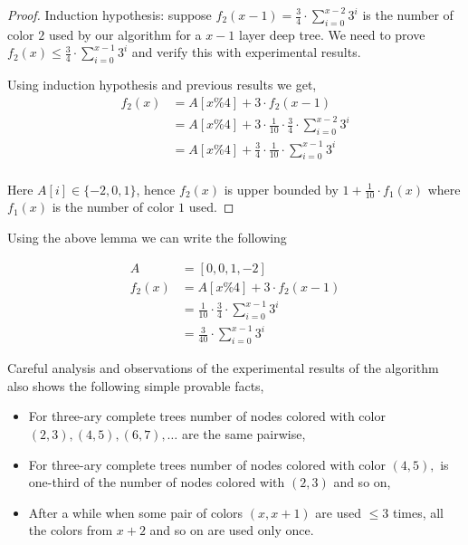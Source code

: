 \documentclass{article}
\theoremstyle{remark}
\begin{document}
\begin{proof}
    Induction hypothesis: suppose $f_2(x - 1) = \frac{3}{4} \cdot \displaystyle\sum_{i = 0} ^{x - 2} 3^i$ is the number of color $2$ used by our algorithm for a $x - 1$ layer deep tree. We need to prove $f_2(x) \leq \frac{3}{4} \cdot \displaystyle\sum_{i = 0} ^{x - 1} 3^i$ and verify this with experimental results.

    Using induction hypothesis and previous results we get,
    \begin{align*}
        f_2(x) &= A[x\%4] + 3 \cdot f_2(x - 1)\\
        &= A[x\%4] + 3 \cdot \frac{1}{10} \cdot \frac{3}{4} \cdot \displaystyle\sum_{i = 0} ^{x - 2} 3^i\\
        &= A[x\%4] + \frac{3}{4} \cdot \frac{1}{10} \cdot \displaystyle\sum_{i = 0} ^{x - 1} 3^i\\
    \end{align*}

    Here $A[i] \in \{-2, 0, 1\}$, hence $f_2(x)$ is upper bounded by $1 + \frac{1}{10} \cdot f_1(x)$ where $f_1(x)$ is the number of color $1$ used.
\end{proof}

Using the above lemma we can write the following

\begin{align*}
    A &= [0, 0, 1, -2]\\
    f_2(x) &= A[x \% 4] + 3 \cdot f_2(x - 1)\\
    &= \frac{1}{10} \cdot \frac{3}{4} \cdot \displaystyle\sum_{i = 0} ^{x - 1} 3^i\\
    &= \frac{3}{40} \cdot \displaystyle\sum_{i = 0} ^{x - 1} 3^i
\end{align*}

Careful analysis and observations of the experimental results of the algorithm also shows the following simple provable facts,

\begin{itemize}
    \item For three-ary complete trees number of nodes colored with color $(2, 3), (4, 5), (6, 7), \dots$ are the same pairwise,
    \item For three-ary complete trees number of nodes colored with color $(4, 5),$ is one-third of the number of nodes colored with $(2, 3)$ and so on,
    \item After a while when some pair of colors $(x, x + 1)$ are used $\leq 3$ times, all the colors from $x + 2$ and so on are used only once.
\end{itemize}
\end{document}
